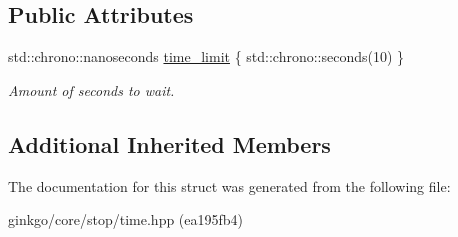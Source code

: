 \subsection*{Public Attributes}
\begin{DoxyCompactItemize}
\item 
\mbox{\label{structgko_1_1stop_1_1Time_1_1parameters__type_aee1d09b9ec4e73561e46e94888cf885a}} 
std\+::chrono\+::nanoseconds \hyperlink{structgko_1_1stop_1_1Time_1_1parameters__type_aee1d09b9ec4e73561e46e94888cf885a}{time\+\_\+limit} \{ std\+::chrono\+::seconds(10) \}
\begin{DoxyCompactList}\small\item\em Amount of seconds to wait. \end{DoxyCompactList}\end{DoxyCompactItemize}
\subsection*{Additional Inherited Members}


The documentation for this struct was generated from the following file\+:\begin{DoxyCompactItemize}
\item 
ginkgo/core/stop/time.\+hpp (ea195fb4)\end{DoxyCompactItemize}
